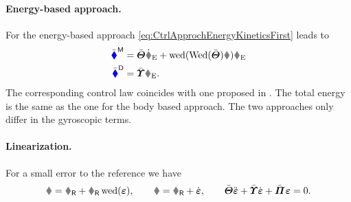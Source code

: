 \paragraph{Energy-based approach.}
For the energy-based approach \eqref{eq:CtrlApprochEnergyKineticsFirst} leads to
\begin{subequations}
\begin{align}
 \genForceInertiaC &= \Jc \wEd + \wedOp(\wedMatOp(\Jc) \w) \wE
\\
 \genForceDissC &= \sigc \wE.
\end{align} 
\end{subequations}
The corresponding control law coincides with one proposed in \cite{Bullo:TrackingAutomatica}.
The total energy is the same as the one for the body based approach.
The two approaches only differ in the gyroscopic terms.



\paragraph{Linearization.}
For a small error to the reference we have
\begin{align}
 \R = \RR + \RR \wedOp(\LinErrorCoord),
\qquad
 \w = \wR + \LinErrorCoordd,
\qquad
 \Jc \LinErrorCoorddd + \sigc \LinErrorCoordd + \kapc \LinErrorCoord = 0.
\end{align}
